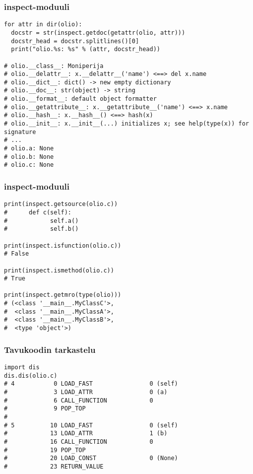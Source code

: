 \documentclass{beamer}
\begin{document}
\begin{frame}[fragile]
\frametitle{inspect-moduuli}
\begin{verbatim}
for attr in dir(olio):
  docstr = str(inspect.getdoc(getattr(olio, attr)))
  docstr_head = docstr.splitlines()[0]
  print("olio.%s: %s" % (attr, docstr_head))

# olio.__class__: Moniperija
# olio.__delattr__: x.__delattr__('name') <==> del x.name
# olio.__dict__: dict() -> new empty dictionary
# olio.__doc__: str(object) -> string
# olio.__format__: default object formatter
# olio.__getattribute__: x.__getattribute__('name') <==> x.name
# olio.__hash__: x.__hash__() <==> hash(x)
# olio.__init__: x.__init__(...) initializes x; see help(type(x)) for signature
# ...
# olio.a: None
# olio.b: None
# olio.c: None

\end{verbatim}
\end{frame}

\begin{frame}[fragile]
\frametitle{inspect-moduuli}
\begin{verbatim}
print(inspect.getsource(olio.c))
#      def c(self):
#            self.a()
#            self.b()

print(inspect.isfunction(olio.c))
# False

print(inspect.ismethod(olio.c))
# True

print(inspect.getmro(type(olio)))
# (<class '__main__.MyClassC'>, 
#  <class '__main__.MyClassA'>, 
#  <class '__main__.MyClassB'>, 
#  <type 'object'>)

\end{verbatim}
\end{frame}


\begin{frame}[fragile]
\frametitle{Tavukoodin tarkastelu}
\begin{verbatim}
import dis
dis.dis(olio.c)
# 4           0 LOAD_FAST                0 (self)
#             3 LOAD_ATTR                0 (a)
#             6 CALL_FUNCTION            0
#             9 POP_TOP             
#
# 5          10 LOAD_FAST                0 (self)
#            13 LOAD_ATTR                1 (b)
#            16 CALL_FUNCTION            0
#            19 POP_TOP             
#            20 LOAD_CONST               0 (None)
#            23 RETURN_VALUE        
\end{verbatim}
\end{frame}
\end{document}
